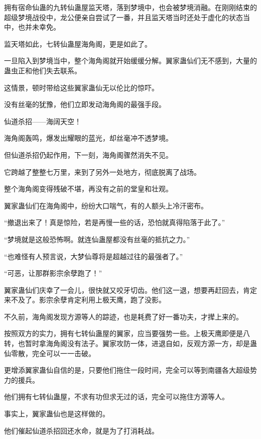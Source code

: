 
\begin{this_body}



拥有宿命仙蛊的九转仙蛊屋监天塔，落到梦境中，也会被梦境消融。在刚刚结束的超级梦境战役中，龙公便亲自尝试了一番，并且监天塔当时还处于虚化的状态当中，也并未幸免。

监天塔如此，七转仙蛊屋海角阁，更是如此了。

一旦陷入到梦境当中，整个海角阁就开始缓缓分解。翼家蛊仙们无不感到，大量的蛊虫正和他们失去联系。

这情景，顿时带给这些翼家蛊仙无以伦比的惊吓。

没有丝毫的犹豫，他们立即发动海角阁的最强手段。

仙道杀招——海阔天空！

海角阁轰鸣，爆发出耀眼的蓝光，却丝毫冲不透梦境。

但仙道杀招仍起作用，下一刻，海角阁骤然消失不见。

它跨越了整整七万里，来到了另外一处地方，彻底脱离了战场。

整个海角阁变得残破不堪，再没有之前的堂皇和壮观。

翼家蛊仙们在海角阁中，纷纷大口喘气，有的人额头上冷汗密布。

“撤退出来了！真是惊险，若是再慢一些的话，恐怕就真得陷落于此了。”

“梦境就是这般恐怖啊。就连仙蛊屋都没有丝毫的抵抗之力。”

“也难怪有人预言说，大梦仙尊将是超越过往的最强者了。”

“可恶，让那群影宗余孽跑了！”

翼家蛊仙们庆幸了一会儿，很快就又咬牙切齿。他们这一退，想要再赶回去，肯定来不及了。影宗余孽肯定利用上极天鹰，跑了没影。

不久前，海角阁发现方源等人的踪迹，也是耗费了好一番功夫，才撵上来的。

按照双方的实力，拥有七转仙蛊屋的翼家，应当要强势一些。上极天鹰即便是八转，也暂时拿海角阁没有法子。翼家攻防一体，进退自如，反观方源一方，却是蛊仙零散，完全可以一一击破。

更增添翼家蛊仙自信的是，只要他们拖住一段时间，完全可以等到南疆各大超级势力的援兵。

他们拥有七转仙蛊屋，不求有功但求无过的话，完全可以拖住方源等人。

事实上，翼家蛊仙也是这样做的。

他们催起仙道杀招回还水命，就是为了打消耗战。


\end{this_body}
